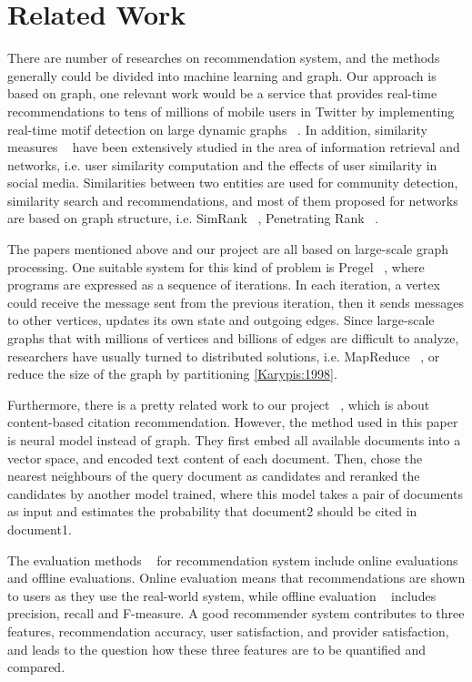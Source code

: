 \section{Related Work}

There are number of researches on recommendation system, and the methods generally could be divided into machine learning and graph. Our approach is based on graph, one relevant work would be 
a service that provides real-time recommendations to tens of millions of mobile users in Twitter by implementing real-time motif detection on large dynamic graphs ~\cite{Gupta:2014}. In addition, similarity measures ~\cite{Goel2013} have been extensively studied in the area of information retrieval and networks, i.e. user similarity computation and the effects of user similarity in social media. Similarities between two entities are used for community detection, similarity search and recommendations, and most of them proposed for networks are based on graph structure, i.e. SimRank ~\cite{Jeh:2002}, Penetrating Rank ~\cite{Zhao:2009}. 

The papers mentioned above and our project are all based on large-scale graph processing. One suitable system for this kind of problem is Pregel ~\cite{Malewicz:2010}, where programs are expressed as a sequence of iterations. In each iteration, a vertex could receive the message sent from the previous iteration, then it sends messages to other vertices, updates its own state and outgoing edges. Since large-scale graphs that with millions of vertices and billions of edges are difficult to analyze, researchers have usually turned to distributed solutions, i.e. MapReduce ~\cite{Lin:2010}, or reduce the size of the graph by partitioning \ref{Karypis:1998}.

Furthermore, there is a pretty related work to our project ~\cite{DBLP}, which is about content-based citation recommendation. However, the method used in this paper is neural model instead of graph. They first embed all available documents into a vector space, and encoded text content of each document. Then, chose the nearest neighbours of the query document as candidates and reranked the candidates by another model trained, where this model takes a pair of documents as input and estimates the probability that document2 should be cited in document1.

The evaluation methods ~\cite{Beel:2013} for recommendation system include online evaluations and offline evaluations. Online evaluation means that recommendations are shown to users as they use the real-world system, while offline evaluation ~\cite{Ricci:2010} includes precision, recall and F-measure. A good recommender system contributes to three features, recommendation accuracy, user satisfaction, and provider satisfaction, and leads to the question how these three features are to be quantified and compared.